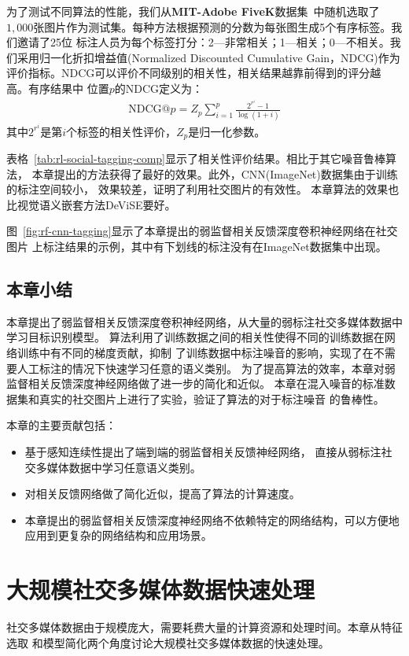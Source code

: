 \documentclass[doctor]{ustcthesis}
\begin{document}
为了测试不同算法的性能，我们从\textbf{MIT-Adobe FiveK}数据集~\cite{fivek}中随机选取了
$1,000$张图片作为测试集。每种方法根据预测的分数为每张图生成5个有序标签。我们邀请了25位
标注人员为每个标签打分：2—非常相关；1—相关；0—不相关。我们采用归一化折扣增益值(Normalized
Discounted Cumulative Gain，NDCG)作为评价指标。NDCG可以评价不同级别的相关性，相关结果越靠前得到的评分越高。有序结果中
位置$p$的NDCG定义为：
\begin{eqnarray}
    \text{NDCG}@p = Z_p \sum_{i=1}^p \frac{2^{r^i} - 1}{\log{(1+i)}}
\end{eqnarray}
其中$2^{r^i}$是第$i$个标签的相关性评价，$Z_p$是归一化参数。

表格~\ref{tab:rl-social-tagging-comp}显示了相关性评价结果。相比于其它噪音鲁棒算法，
本章提出的方法获得了最好的效果。此外，CNN(ImageNet)数据集由于训练的标注空间较小，
效果较差，证明了利用社交图片的有效性。
本章算法的效果也比视觉语义嵌套方法DeViSE要好。

图~\ref{fig:rf-cnn-tagging}显示了本章提出的弱监督相关反馈深度卷积神经网络在社交图片
上标注结果的示例，其中有下划线的标注没有在ImageNet数据集中出现。

\section{本章小结}
本章提出了弱监督相关反馈深度卷积神经网络，从大量的弱标注社交多媒体数据中学习目标识别模型。
算法利用了训练数据之间的相关性使得不同的训练数据在网络训练中有不同的梯度贡献，抑制
了训练数据中标注噪音的影响，实现了在不需要人工标注的情况下快速学习任意的语义类别。
为了提高算法的效率，本章对弱监督相关反馈深度神经网络做了进一步的简化和近似。
本章在混入噪音的标准数据集和真实的社交图片上进行了实验，验证了算法的对于标注噪音
的鲁棒性。

本章的主要贡献包括：
\vspace{-0.5em}
\begin{itemize}\setlength{\itemsep}{-0.2em}
    \item 基于感知连续性提出了端到端的弱监督相关反馈神经网络，
        直接从弱标注社交多媒体数据中学习任意语义类别。
    \item 对相关反馈网络做了简化近似，提高了算法的计算速度。
    \item 本章提出的弱监督相关反馈深度神经网络不依赖特定的网络结构，可以方便地
        应用到更复杂的网络结构和应用场景。
\end{itemize}

\chapter{大规模社交多媒体数据快速处理}
社交多媒体数据由于规模庞大，需要耗费大量的计算资源和处理时间。本章从特征选取
和模型简化两个角度讨论大规模社交多媒体数据的快速处理。
\end{document}
